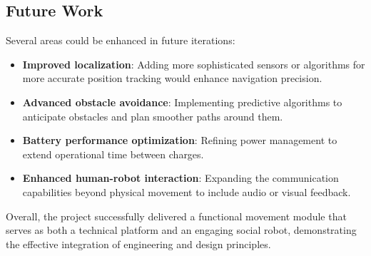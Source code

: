 \subsection{Future Work}

Several areas could be enhanced in future iterations:

\begin{itemize}
    \item \textbf{Improved localization}: Adding more sophisticated sensors or algorithms for more accurate position tracking would enhance navigation precision.
    
    \item \textbf{Advanced obstacle avoidance}: Implementing predictive algorithms to anticipate obstacles and plan smoother paths around them.
    
    \item \textbf{Battery performance optimization}: Refining power management to extend operational time between charges.
    
    \item \textbf{Enhanced human-robot interaction}: Expanding the communication capabilities beyond physical movement to include audio or visual feedback.
\end{itemize}

Overall, the project successfully delivered a functional movement module that serves as both a technical platform and an engaging social robot, demonstrating the effective integration of engineering and design principles.
